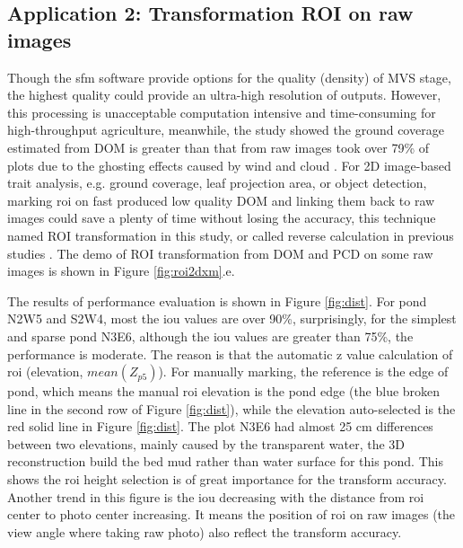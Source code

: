 \documentclass{configs/bmcart}
\begin{document}
\subsection*{Application 2: Transformation ROI on raw images}
Though the \acrshort*{sfm} software provide options for the quality (density) of MVS stage, the highest quality could provide an ultra-high resolution of outputs. However, this processing is unacceptable computation intensive and time-consuming for high-throughput agriculture, meanwhile, the study showed the ground coverage estimated from DOM is greater than that from raw images took over 79\% of plots due to the ghosting effects caused by wind and cloud \cite{duan_comparison_2017}. For 2D image-based trait analysis, e.g. ground coverage, leaf projection area, or object detection, marking \acrfull*{roi} on fast produced low quality DOM and linking them back to raw images could save a plenty of time without losing the accuracy, this technique named ROI transformation in this study, or called reverse calculation in previous studies \cite{duan_comparison_2017,tresch_easympe_2019}. The demo of ROI transformation from DOM and PCD on some raw images is shown in Figure \ref{fig:roi2dxm}.e.

The results of performance evaluation is shown in Figure \ref{fig:dist}. For pond N2W5 and S2W4, most the \acrshort*{iou} values are over 90\%, surprisingly, for the simplest and sparse pond N3E6, although the \acrshort{iou} values are greater than 75\%, the performance is moderate. The reason is that the automatic z value calculation of \acrshort*{roi} (elevation, $mean(Z_{p5})$). For manually marking, the reference is the edge of pond, which means the manual \acrshort*{roi} elevation is the pond edge (the blue broken line in the second row of Figure \ref{fig:dist}), while the elevation auto-selected is the red solid line in Figure \ref{fig:dist}. The plot N3E6 had almost 25 cm differences between two elevations, mainly caused by the transparent water, the 3D reconstruction build the bed mud rather than water surface for this pond. This shows the \acrshort*{roi} height selection is of great importance for the transform accuracy. Another trend in this figure is the \acrshort*{iou} decreasing with the distance from \acrshort*{roi} center to photo center increasing. It means the position of \acrshort*{roi} on raw images (the view angle where taking raw photo) also reflect the transform accuracy. 
\end{document}
